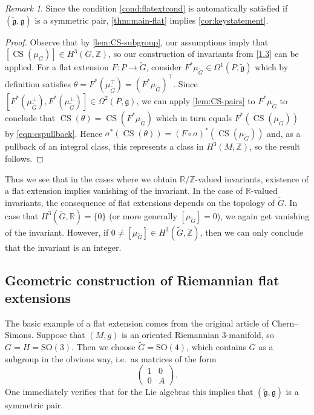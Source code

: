 \documentclass[british,11pt,a4paper]{amsart}
\numberwithin{equation}{section}
\renewcommand\frak{\mathfrak}
\renewcommand{\o}{\circ}
\renewcommand{\th}{\theta}
\newcommand{\si}{\sigma}
\newcommand{\Om}{\Omega}
\newcommand{\CS}{\operatorname{CS}}
\newcommand{\tfg}{\widetilde{\mathfrak g}}
\newcommand{\Z}{\mathbb{Z}}
\newcommand*{\R}{\mathbb{R}}
\newcommand{\col}{:}
\newcounter{theorem}
\numberwithin{theorem}{section}
\theoremstyle{definition}
\theoremstyle{remark}
\newtheorem{remark}[theorem]{Remark}
\begin{document}
\begin{remark}
Since the condition \eqref{cond:flatextcond} is automatically satisfied if $(\tilde{\mathfrak{g}},\mathfrak{g})$ is a symmetric pair, \cref{thm:main-flat} implies \cref{cor:keystatement}.
\end{remark}

\begin{proof}
 Observe that by \cref{lem:CS-subgroup}, our assumptions imply that $[\CS(\mu_G)]\in
 H^3(G,\Z)$, so our construction of invariants from \cref{1.3} can be applied. For a
 flat extension $F\col P\to \tilde G$, consider $F^*\mu_{\tilde G}\in
 \Om^1(P,\tfg)$ which by definition satisfies
 $\theta=F^*(\mu_{\tilde{G}}^\top)=(F^*\mu_{\tilde G})^\top$.  Since
   $[F^*(\mu_{\tilde G}^\perp),F^*(\mu_{\tilde G}^\perp)]\in\Om^2(P,\frak{g})$, we
   can apply \cref{lem:CS-pairs} to $F^*\mu_{\tilde G}$ to conclude that
   $\CS(\th)=\CS(F^*\mu_{\tilde G})$ which in turn equals $F^*(\CS(\mu_{\tilde G}))$
   by \eqref{eqn:cspullback}. Hence
   $\si^*(\CS(\theta))=(F\o\si)^*(\CS(\mu_{\widetilde{G}}))$ and, as a pullback of an
   integral class, this represents a class in $H^3(M,\Z)$, so the result follows.
\end{proof}

Thus we see that in the cases where we obtain $\R/\Z$-valued invariants, existence of a flat extension implies vanishing of the invariant. In the case of $\R$-valued invariants, the consequence of flat extensions depends on the topology of $\widetilde{G}$. In case that $H^3(\widetilde{G},\R)=\{0\}$ (or more generally $[\mu_{\widetilde{G}}]=0$), we again get vanishing of the invariant. However, if $0\neq [\mu_{\widetilde{G}}]\in H^3(\widetilde{G},\Z)$, then we can only conclude that the invariant is an integer.

\subsection{Geometric construction of Riemannian flat extensions}\label{1.6}
The basic example of a flat extension comes from the original article of
Chern--Simons. Suppose that $(M,g)$ is an oriented Riemannian $3$-manifold, so $G=H=\mathrm{SO}(3)$. Then we choose $\tilde G=\mathrm{SO}(4)$, which contains $G$ as
a subgroup in the obvious way, i.e.\ as matrices of the form 
\[\begin{pmatrix} 1 & 0
  \\ 0 & A \end{pmatrix}.
  \]
One immediately verifies that for the Lie algebras this
implies that $(\tfg,\frak{g})$ is a symmetric pair.
\end{document}
